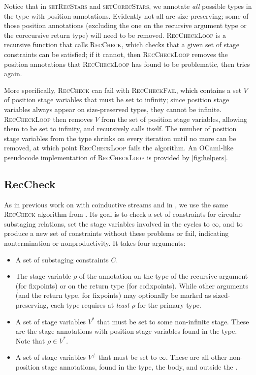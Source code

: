 \documentclass[nonacm,screen,10pt]{acmart}
\begin{document}


Notice that in \textsc{setRecStars} and \textsc{setCorecStars}, we annotate \textit{all} possible \coinductive types in the \cofixpoint type with position annotations. Evidently not all \cofixpoints are size-preserving; some of those position annotations (excluding the one on the recursive argument type or the corecursive return type) will need to be removed. \textsc{RecCheckLoop} is a recursive function that calls \textsc{RecCheck}, which checks that a given set of stage constraints can be satisfied; if it cannot, then \textsc{RecCheckLoop} removes the position annotations that \textsc{RecCheckLoop} has found to be problematic, then tries again. 

More specifically, \textsc{RecCheck} can fail with \textsc{RecCheckFail}, which contains a set $V$ of position stage variables that must be set to infinity; since position stage variables always appear on size-preserved types, they cannot be infinite. \textsc{RecCheckLoop} then removes $V$ from the set of position stage variables, allowing them to be set to infinity, and recursively calls itself. The number of position stage variables from the \cofixpoint type shrinks on every iteration until no more can be removed, at which point \textsc{RecCheckLoop} fails the algorithm. An OCaml-like pseudocode implementation of \textsc{RecCheckLoop} is provided by \autoref{fig:helpers}.

\subsection{RecCheck}

As in previous work on \CChatomega with coinductive streams \cite{cc-hat-omega} and in \CIChat, we use the same \textsc{RecCheck} algorithm from \Fhat \cite{f-hat}. Its goal is to check a set of constraints for circular substaging relations, set the stage variables involved in the cycles to $\infty$, and to produce a new set of constraints without these problems or fail, indicating nontermination or nonproductivity. It takes four arguments:

\begin{itemize}
    \item A set of substaging constraints $C$.
    \item The stage variable $\rho$ of the annotation on the type of the recursive argument (for fixpoints) or on the return type (for cofixpoints). While other arguments (and the return type, for fixpoints) may optionally be marked as sized-preserving, each \cofixpoint type requires at \textit{least} $\rho$ for the primary \corecursive type.
    \item A set of stage variables $V^*$ that must be set to some non-infinite stage. These are the stage annotations with position stage variables found in the \cofixpoint type. Note that $\rho \in V^*$.
    \item A set of stage variables $V^\neq$ that must be set to $\infty$. These are all other non-position stage annotations, found in the \cofixpoint type, the \cofixpoint body, and outside the \cofixpoint.
\end{itemize}
\end{document}
